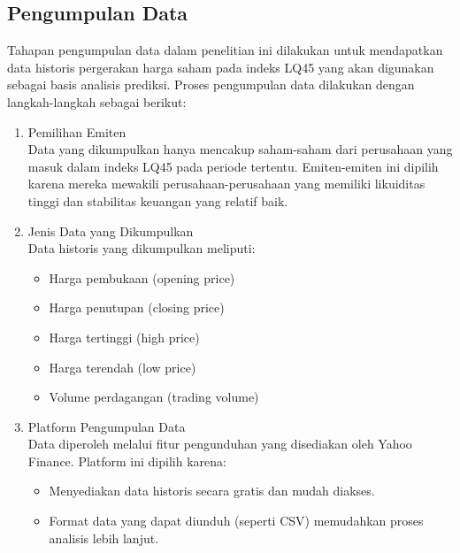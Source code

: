 \begin{subs}
	\subsection{Pengumpulan Data}
	\indent

	Tahapan pengumpulan data dalam penelitian ini dilakukan untuk mendapatkan data historis pergerakan harga saham pada indeks LQ45 yang akan digunakan sebagai basis analisis prediksi. Proses pengumpulan data dilakukan dengan langkah-langkah sebagai berikut:
	\begin{enumerate}
		\item Pemilihan Emiten \\
		      Data yang dikumpulkan hanya mencakup saham-saham dari perusahaan yang masuk dalam indeks LQ45 pada periode tertentu. Emiten-emiten ini dipilih karena mereka mewakili perusahaan-perusahaan yang memiliki likuiditas tinggi dan stabilitas keuangan yang relatif baik.

		\item Jenis Data yang Dikumpulkan \\
		      Data historis yang dikumpulkan meliputi:
		      \begin{itemize}
			      \item Harga pembukaan (opening price)
			      \item Harga penutupan (closing price)
			      \item Harga tertinggi (high price)
			      \item Harga terendah (low price)
			      \item Volume perdagangan (trading volume)
		      \end{itemize}

		\item Platform Pengumpulan Data \\
		      Data diperoleh melalui fitur pengunduhan yang disediakan oleh Yahoo Finance. Platform ini dipilih karena:
		      \begin{itemize}
			      \item Menyediakan data historis secara gratis dan mudah diakses.
			      \item Format data yang dapat diunduh (seperti CSV) memudahkan proses analisis lebih lanjut.
		      \end{itemize}


\end{enumerate}
\end{subs}
